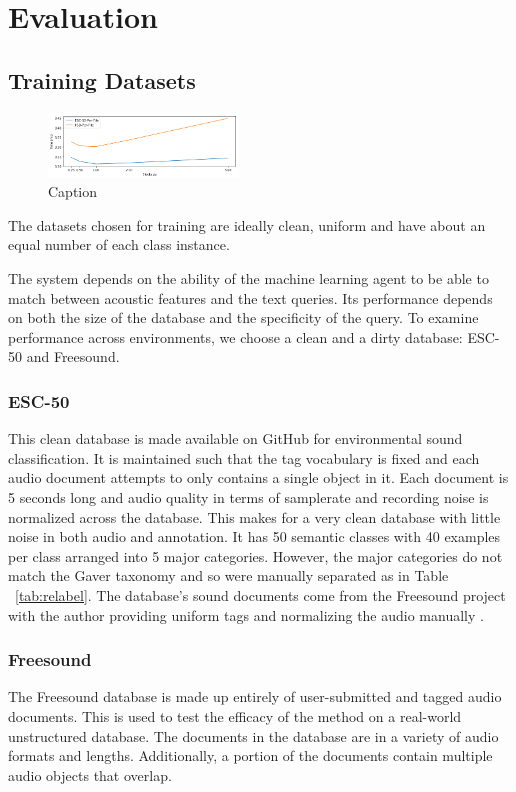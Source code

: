 \section{Evaluation}

\subsection{Training Datasets}
\begin{figure}
    \centering
    \includegraphics[width=0.45\textwidth]{figures/dataset-load-time.png}
    \caption{Caption}
    \label{fig:load-time}
\end{figure}

The datasets chosen for training are ideally clean, uniform and have about an equal number of each class instance. 

The system depends on the ability of the machine learning agent to be able to
match between acoustic features and the text queries. Its performance depends on
both the size of the database and the specificity of the query. To examine
performance across environments, we choose a clean and a dirty database: ESC-50
\cite{Piczak2015} and Freesound.

\subsubsection{ESC-50}
This clean database is made available on GitHub for environmental sound
classification. It is maintained such that the tag vocabulary is fixed and each
audio document attempts to only contains a single object in it. Each document is
5 seconds long and audio quality in terms of samplerate and recording noise is
normalized across the database. This makes for a very clean database with little
noise in both audio and annotation. It has 50 semantic classes with 40 examples
per class arranged into 5 major categories. However, the major categories do not
match the Gaver taxonomy and so were manually separated as in Table
~\ref{tab:relabel}. The database's sound documents come from the Freesound
project with the author providing uniform tags and normalizing the audio
manually \cite{Font2013}.

\subsubsection{Freesound}
The Freesound database is made up entirely of user-submitted and tagged audio documents. This is used to test the efficacy of the method on a real-world unstructured database. The documents in the database are in a variety of audio formats and lengths. Additionally, a portion of the documents contain multiple audio objects that overlap.


